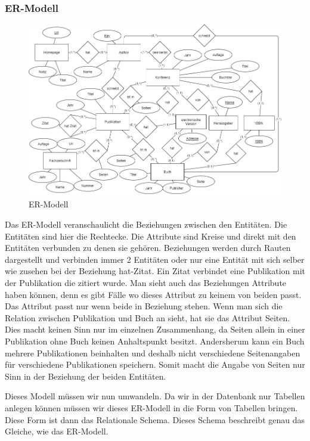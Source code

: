 \subsubsection{ER-Modell}
\begin{figure}[!htb]
	\centering
	\includegraphics[width=14cm,keepaspectratio]{bilder/ER-Modell}
	\caption{ER-Modell}
	\label{fig:er-modell}
\end{figure}
Das ER-Modell veranschaulicht die Beziehungen zwischen den Entitäten. Die Entitäten sind hier die Rechtecke. Die Attribute sind Kreise und direkt mit den Entitäten verbunden zu denen sie gehören. Beziehungen werden durch Rauten dargestellt und verbinden immer 2 Entitäten oder nur eine Entität mit sich selber wie zusehen bei der Beziehung hat-Zitat. Ein Zitat verbindet eine Publikation mit der Publikation die zitiert wurde. Man sieht auch das Beziehungen Attribute haben können, denn es gibt Fälle wo dieses Attribut zu keinem von beiden passt. Das Attribut passt nur wenn beide in Beziehung stehen. Wenn man sich die Relation zwischen Publikation und Buch an sieht, hat sie das Attribut Seiten. Dies macht keinen Sinn nur im einzelnen Zusammenhang, da Seiten allein in einer Publikation ohne Buch keinen Anhaltspunkt besitzt. Andersherum kann ein Buch mehrere Publikationen beinhalten und deshalb nicht verschiedene Seitenangaben für verschiedene Publikationen speichern. Somit macht die Angabe von Seiten nur Sinn in der Beziehung der beiden Entitäten.

Dieses Modell müssen wir nun umwandeln. Da wir in der Datenbank nur Tabellen anlegen können müssen wir dieses ER-Modell in die Form von Tabellen bringen. Diese Form ist dann das Relationale Schema. Dieses Schema beschreibt genau das Gleiche, wie das ER-Modell.

